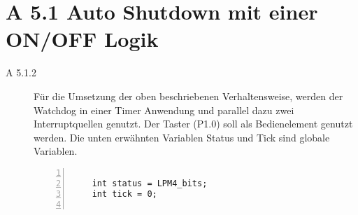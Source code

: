 \documentclass[11pt,a4paper,ngerman]{article}
\begin{document}
\section*{A 5.1 Auto Shutdown mit einer ON/OFF Logik}
\begin{description}
	\item[A 5.1.2] Für die Umsetzung der oben beschriebenen Verhaltensweise, werden der Watchdog in einer Timer Anwendung und parallel dazu zwei Interruptquellen genutzt. Der Taster (P1.0) soll als Bedienelement genutzt werden. Die unten erwähnten Variablen Status und Tick sind globale Variablen. \\
	
	\begin{lstlisting}[numbers=left]
	
	int status = LPM4_bits;
	int tick = 0;
	
	\end{lstlisting}
\end{description}
	
\label{LastPage}
\end{document}
